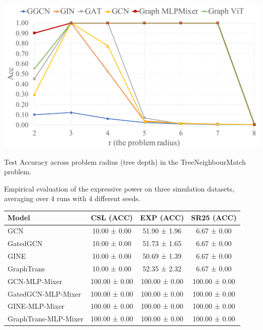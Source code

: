 \documentclass{article}
\begin{document}
  \begin{minipage}{\textwidth}
  \begin{minipage}[c]{0.48\textwidth}
    \centering
      \includegraphics[scale=0.25]{figs/tree_neighbour_v2.pdf}
      \captionsetup{type=figure}
    \caption{Test Accuracy across problem radius (tree depth) in the TreeNeighbourMatch problem.}
    \label{fig: tree neighbour}
  \end{minipage}
  \hfill
  \begin{minipage}[c]{0.50\textwidth}
  \captionsetup{type=table}
  \caption{Empirical evaluation of the expressive power on three simulation datasets, averaging over 4 runs with 4 different seeds.}
  \label{tab: Expressivity}
  \scriptsize
    \centering
    \begin{tabular}{lccc}
    \toprule
    Model & CSL (ACC)& EXP (ACC) & SR25 (ACC) \\
    \midrule
    GCN & 10.00 ± 0.00 & 51.90 ± 1.96 & 6.67 ± 0.00\\
    GatedGCN & 10.00 ± 0.00 & 51.73 ± 1.65& 6.67 ± 0.00\\
    GINE & 10.00 ± 0.00 & 50.69 ± 1.39&6.67 ± 0.00\\
    GraphTrans& 10.00 ± 0.00 & 52.35 ± 2.32 &6.67 ± 0.00\\
    \midrule
         {GCN-MLP-Mixer} & 100.00 ± 0.00 & 100.00 ± 0.00 & 100.00 ± 0.00  \\
         {GatedGCN-MLP-Mixer} & 100.00 ± 0.00 & 100.00 ± 0.00 & 100.00 ± 0.00  \\
         {GINE-MLP-Mixer} & 100.00 ± 0.00 & 100.00 ± 0.00 & 100.00 ± 0.00  \\
         {GraphTrans-MLP-Mixer}& 100.00 ± 0.00 & 100.00 ± 0.00 & 100.00 ± 0.00  \\
         \bottomrule
    \end{tabular}
    \end{minipage}
  \end{minipage}
\end{document}
